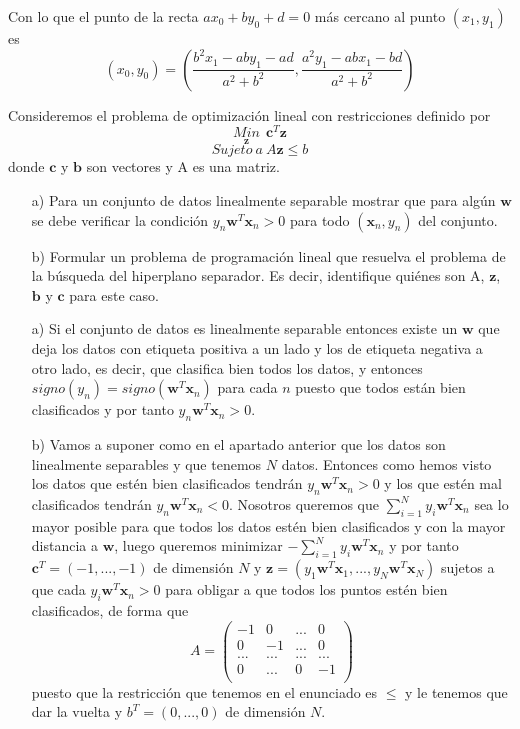 \documentclass[12pt]{article}
\theoremstyle{definition}
\begin{document}
\begin{pregunta}
Con lo que el punto de la recta $ax_0+by_0+d=0$ más cercano al punto $(x_1,y_1)$ es
\[ (x_0,y_0) = (\frac{b^2x_1 - aby_1 -ad}{a^2+b^2}, \frac{a^2y_1 - abx_1 -bd}{a^2+b^2})	\]

\end{pregunta}

\begin{pregunta}
Consideremos el problema de optimización lineal con restricciones definido por 
\[	\underset{\mathbf{z}}{Min} \ \ \mathbf{c}^T\mathbf{z}	\]
\[	Sujeto\ a\ A\mathbf{z} \leq b	\]
donde $\mathbf{c}$ y $\mathbf{b}$ son vectores y A es una matriz.
\begin{enumerate}
\item[a)] Para un conjunto de datos linealmente separable mostrar que para algún $\mathbf{w}$ se debe verificar la condición $y_n\mathbf{w}^T\mathbf{x}_n > 0$ para todo $(\mathbf{x}_n, y_n)$ del conjunto.
\item[b)] Formular un problema de programación lineal que resuelva el problema de la búsqueda del hiperplano separador. Es decir, identifique quiénes son A, $\mathbf{z}$, $\mathbf{b}$ y $\mathbf{c}$ para este caso.
\end{enumerate}

\begin{enumerate}
\item[a)] Si el conjunto de datos es linealmente separable entonces existe un $\mathbf{w}$ que deja los datos con etiqueta positiva a un lado y los de etiqueta negativa a otro lado, es decir, que clasifica bien todos los datos, y entonces $signo(y_n) = signo(\mathbf{w}^T\mathbf{x}_n)$ para cada $n$ puesto que todos están bien clasificados y por tanto $y_n\mathbf{w}^T\mathbf{x}_n > 0$.
\item[b)] Vamos a suponer como en el apartado anterior que los datos son linealmente separables y que tenemos $N$ datos. Entonces como hemos visto los datos que estén bien clasificados tendrán $y_n\mathbf{w}^T\mathbf{x}_n > 0$ y los que estén mal clasificados tendrán $y_n\mathbf{w}^T\mathbf{x}_n < 0$. Nosotros queremos que $\sum_{i=1}^Ny_i\mathbf{w}^T\mathbf{x}_n$ sea lo mayor posible para que todos los datos estén bien clasificados y con la mayor distancia a $\mathbf{w}$, luego queremos minimizar $-\sum_{i=1}^Ny_i\mathbf{w}^T\mathbf{x}_n$ y por tanto $\mathbf{c}^T=(-1,...,-1)$ de dimensión $N$ y $\mathbf{z} = (y_1\mathbf{w}^T\mathbf{x}_1,...,y_N\mathbf{w}^T\mathbf{x}_N)$ sujetos a que cada $y_i\mathbf{w}^T\mathbf{x}_n > 0$ para obligar a que todos los puntos estén bien clasificados, de forma que
\[ A = 	\left( \begin{array}{cccc}
		-1 &  0 & ... &  0 \\
		0 & -1 & ... & 0 \\
		... & ... & ... & ... \\
		0 & ... & 0 & -1 \\ \end{array} \right)
\]
puesto que la restricción que tenemos en el enunciado es $\leq$ y le tenemos que dar la vuelta y $b^T = (0,...,0)$ de dimensión $N$.
\end{enumerate}

\end{pregunta}
\end{document}
